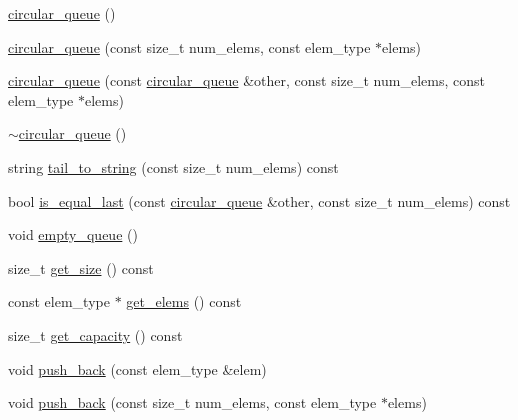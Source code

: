 \begin{DoxyCompactItemize}
\item 
\hyperlink{classuva_1_1utils_1_1containers_1_1circular__queue_a0f3cfa7c8a76b1686871c77ec3508b48}{circular\+\_\+queue} ()
\item 
\hyperlink{classuva_1_1utils_1_1containers_1_1circular__queue_a7eda88bb8d265d2e59b5297bc7432975}{circular\+\_\+queue} (const size\+\_\+t num\+\_\+elems, const elem\+\_\+type $\ast$elems)
\item 
\hyperlink{classuva_1_1utils_1_1containers_1_1circular__queue_a715ab0cc8582e8085e90ae1199554b92}{circular\+\_\+queue} (const \hyperlink{classuva_1_1utils_1_1containers_1_1circular__queue}{circular\+\_\+queue} \&other, const size\+\_\+t num\+\_\+elems, const elem\+\_\+type $\ast$elems)
\item 
\hyperlink{classuva_1_1utils_1_1containers_1_1circular__queue_a72869d5ebcccdb8d539905daddf57423}{$\sim$circular\+\_\+queue} ()
\item 
string \hyperlink{classuva_1_1utils_1_1containers_1_1circular__queue_a37758c3a912988f36270c70c8dd6f14b}{tail\+\_\+to\+\_\+string} (const size\+\_\+t num\+\_\+elems) const 
\item 
bool \hyperlink{classuva_1_1utils_1_1containers_1_1circular__queue_a1b203fec6a2094d1de2c2ef1e02b444a}{is\+\_\+equal\+\_\+last} (const \hyperlink{classuva_1_1utils_1_1containers_1_1circular__queue}{circular\+\_\+queue} \&other, const size\+\_\+t num\+\_\+elems) const 
\item 
void \hyperlink{classuva_1_1utils_1_1containers_1_1circular__queue_a9b013f67ae21602ac9a59d0d732864bd}{empty\+\_\+queue} ()
\item 
size\+\_\+t \hyperlink{classuva_1_1utils_1_1containers_1_1circular__queue_a2c3d2c71de59ad163603340ac2ea3ee8}{get\+\_\+size} () const 
\item 
const elem\+\_\+type $\ast$ \hyperlink{classuva_1_1utils_1_1containers_1_1circular__queue_ac38be9d542adbe80413949f271b572f4}{get\+\_\+elems} () const 
\item 
size\+\_\+t \hyperlink{classuva_1_1utils_1_1containers_1_1circular__queue_a13152fd9c24949b59f6fee447c57ea6b}{get\+\_\+capacity} () const 
\item 
void \hyperlink{classuva_1_1utils_1_1containers_1_1circular__queue_a356d927e319e0909e28564fdbeaa6c4f}{push\+\_\+back} (const elem\+\_\+type \&elem)
\item 
void \hyperlink{classuva_1_1utils_1_1containers_1_1circular__queue_a02f8b7922515eccb3512266210eabb90}{push\+\_\+back} (const size\+\_\+t num\+\_\+elems, const elem\+\_\+type $\ast$elems)
\end{DoxyCompactItemize}


